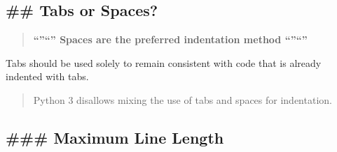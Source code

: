 \documentclass[11pt]{article}
\begin{document}
    \hypertarget{tabs-or-spaces}{%
\subsection{\#\# Tabs or Spaces?}\label{tabs-or-spaces}}

\begin{quote}
\textbf{``''``'' Spaces are the preferred indentation method ``''``''}
\end{quote}

Tabs should be used solely to remain consistent with code that is
already indented with tabs.

\begin{quote}
Python 3 disallows mixing the use of tabs and spaces for indentation.
\end{quote}

    \hypertarget{maximum-line-length}{%
\subsection{\#\#\# Maximum Line Length}\label{maximum-line-length}}
\end{document}
